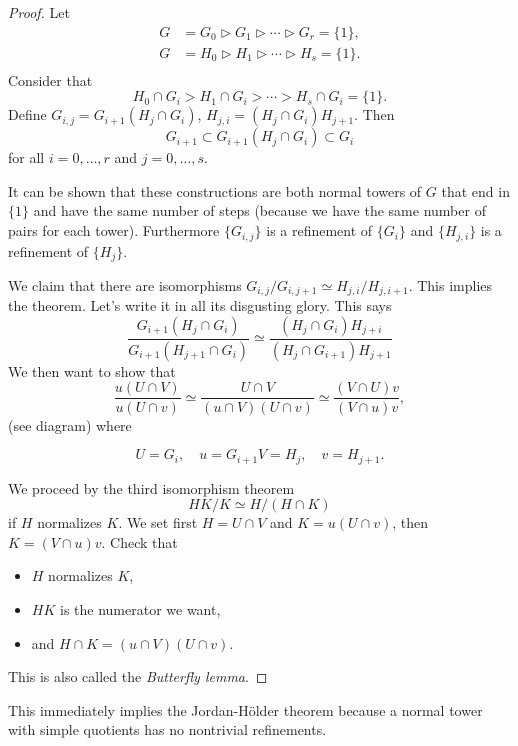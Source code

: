 \documentclass{article}
\begin{document}
\begin{proof}
Let 
\begin{align*}
G &= G_0 \triangleright G_1 \triangleright 
     \cdots \triangleright G_r = \{ 1\}, \\
G &= H_0 \triangleright H_1 \triangleright 
     \cdots \triangleright H_s = \{ 1\}. \\
\end{align*}
Consider that
$$
H_0 \cap G_i > H_1 \cap G_i > \cdots > H_s \cap G_i = \{1\}.
$$
Define $G_{i,j} = G_{i+1}(H_j \cap G_i)$,
$H_{j,i} = (H_j \cap G_i)H_{j+1}$. Then
$$
G_{i+1} \subset G_{i+1} (H_j \cap G_i) \subset G_i
$$
for all $i=0,\dots,r$ and $j=0,\dots,s$. 

It can be shown that these
constructions are both normal towers of $G$ that end in $\{1\}$ and
have the same number of steps (because we have the same number of
pairs for each tower). Furthermore $\{G_{i,j}\}$ is a refinement of 
$\{G_i\}$ and $\{H_{j,i}\}$ is a refinement of $\{H_j\}$.

We claim that there are isomorphisms 
$G_{i,j} / G_{i,j+1} \simeq H_{j,i} / H_{j, i+1}$. This implies the
theorem. Let's write it in all its disgusting glory. This says
$$
\frac{G_{i+1} (H_j \cap G_i)}{G_{i+1} (H_{j+1} \cap G_i)}
\simeq
\frac{(H_j \cap G_i) H_{j+i}}{(H_j \cap G_{i+1}) H_{j+1}}
$$
We then want to show that
$$
\frac{u(U \cap V)}{u(U \cap v)}
\simeq
\frac{U \cap V}{(u \cap V)(U \cap v)}
\simeq
\frac{(V \cap U)v}{(V \cap u)v},
$$
(see diagram) where

$$
U = G_i, \quad
u = G_{i+1}
V = H_j, \quad
v = H_{j+1}.
$$

We proceed by the third isomorphism theorem
$$
HK / K \simeq H / (H \cap K)
$$
if $H$ normalizes $K$. We set first
$H = U \cap V$ and $K = u(U \cap v)$, then
$K = (V \cap u)v$. Check that 
\begin{itemize}
  \item{$H$ normalizes $K$,}
  \item{$HK$ is the numerator we want,}
  \item{and $H \cap K = (u \cap V)(U \cap v)$.}
\end{itemize}

This is also called the \emph{Butterfly lemma}.
\end{proof}

This immediately implies the Jordan-H\"older theorem because a normal
tower with simple quotients has no nontrivial refinements.
\end{document}
